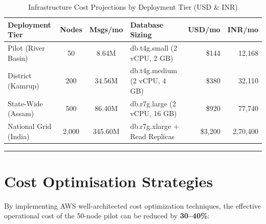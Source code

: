 \documentclass[11pt,a4paper]{article}
\newcommand{\colorrule}{\vspace{4pt}\noindent\textcolor{FloodBlue!30}{\rule{\linewidth}{0.5pt}}\vspace{6pt}}
\begin{document}
\begin{table}[htbp]
\centering
\renewcommand{\arraystretch}{1.2}
\footnotesize
\begin{tabularx}{\linewidth}{l c c X r r}
\toprule
\textbf{Deployment Tier} & \textbf{Nodes} & \textbf{Msgs/mo} & \textbf{Database Sizing} & \textbf{USD/mo} & \textbf{INR/mo} \\
\midrule
Pilot (River Basin)     &    50 &   8.64M & db.t4g.small (2 vCPU, 2 GB)   & \$144   & 12,168 \\
District (Kamrup)       &   200 &  34.56M & db.t4g.medium (2 vCPU, 4 GB)  & \$380   & 32,110 \\
State-Wide (Assam)      &   500 &  86.40M & db.r7g.large (2 vCPU, 16 GB)  & \$920   & 77,740 \\
National Grid (India)   & 2,000 & 345.60M & db.r7g.xlarge + Read Replicas & \$3,200 & 2,70,400 \\
\bottomrule
\end{tabularx}
\caption{Infrastructure Cost Projections by Deployment Tier (USD \& INR)}
\label{tab:scaling}
\end{table}

\colorrule

\section{Cost Optimisation Strategies}

By implementing AWS well-architected cost optimization techniques, the effective operational cost of the 50-node pilot can be reduced by \textbf{30--40\%}:
\end{document}
